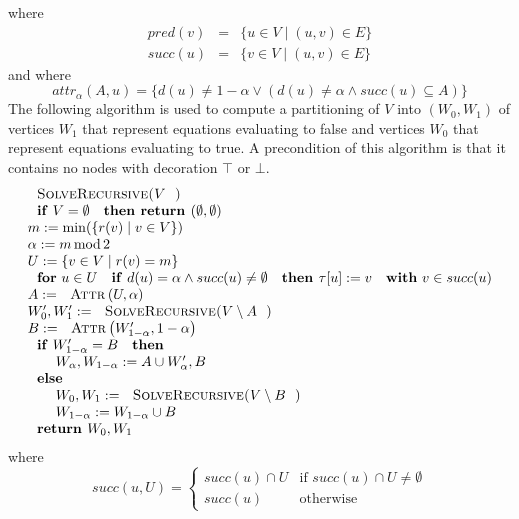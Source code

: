 where%
\begin{eqnarray*}
pred(v) &=&\{u\in V\mid (u,v)\in E\} \\
succ(u) &=&\{v\in V\mid (u,v)\in E\}
\end{eqnarray*}%
and where%
\begin{equation*}
attr_{\alpha }(A,u)=\{d(u)\neq 1-\alpha \vee \left( d(u)\neq \alpha \wedge
succ(u)\subseteq A\right) \}
\end{equation*}%
The following algorithm is used to compute a partitioning of $V$ into $%
\left( W_{0},W_{1}\right) $ of vertices $W_{1}$ that represent equations
evaluating to false and vertices $W_{0}$ that represent equations evaluating
to true. A precondition of this algorithm is that it contains no nodes with
decoration $\top $ or $\bot $.%
\begin{equation*}
\begin{array}{l}
\text{\textsc{SolveRecursive(}}V\text{\textsc{)}} \\ 
\text{\textbf{if} }V=\emptyset \text{ \textbf{then return }}(\emptyset
,\emptyset ) \\ 
m:=\min (\{r(v)\mid v\in V\}) \\ 
\alpha :=m\func{mod}2 \\ 
U:=\{v\in V\mid r(v)=m\} \\ 
\text{\textbf{for} }u\in U\text{ \textbf{if} }d(u)=\alpha \wedge succ(u)\neq
\emptyset \text{ \textbf{then }}\tau \lbrack u]:=v\text{ \textbf{with} }v\in
succ(u) \\ 
A:=\text{\textsc{Attr}}\left( U,\alpha \right)  \\ 
W_{0}^{\prime },W_{1}^{\prime }:=\text{\textsc{SolveRecursive(}}V\setminus A%
\text{)} \\ 
B:=\text{\textsc{Attr}}\left( W_{1-\alpha }^{\prime },1-\alpha \right)  \\ 
\text{\textbf{if} }W_{1-\alpha }^{\prime }=B\text{ \textbf{then}} \\ 
\qquad W_{\alpha },W_{1-\alpha }:=A\cup W_{\alpha }^{\prime },B \\ 
\text{\textbf{else}} \\ 
\qquad W_{0},W_{1}:=\text{\textsc{SolveRecursive(}}V\setminus B\text{)} \\ 
\qquad W_{1-\alpha }:=W_{1-\alpha }\cup B \\ 
\text{\textbf{return }}W_{0},W_{1}%
\end{array}%
\end{equation*}%
where%
\begin{equation*}
succ(u,U)=\left\{ 
\begin{array}{ll}
succ(u)\cap U & \text{if }succ(u)\cap U\neq \emptyset  \\ 
succ(u) & \text{otherwise}%
\end{array}%
\right. 
\end{equation*}


